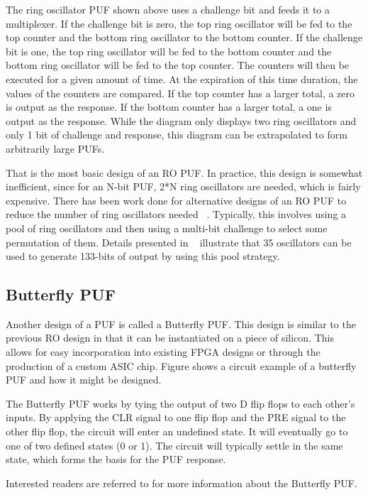 The ring oscillator PUF shown above uses a challenge bit and feeds it to a multiplexer.
If the challenge bit is zero, the top ring oscillator will be fed to the top counter and
the bottom ring oscillator to the bottom counter. If the challenge bit is one, the top
ring oscillator will be fed to the bottom counter and the bottom ring oscillator will
be fed to the top counter. The counters will then be executed for a given amount of time.
At the expiration of this time duration, the values of the counters are compared. If the
top counter has a larger total, a zero is output as the response. If the bottom counter
has a larger total, a one is output as the response. 
While the diagram only displays two ring oscillators and only 1 bit of challenge and
response, this diagram can be extrapolated to form arbitrarily large PUFs.

That is the most basic design of an RO PUF. In practice, this design is somewhat 
inefficient, since for an N-bit PUF, 2*N ring oscillators are needed, which is fairly
expensive. There has been work done for alternative designs of
an RO PUF to reduce the number of ring oscillators needed ~\cite{aegis_pool}. 
Typically, this involves using
a pool of ring oscillators and then using a multi-bit challenge to select some permutation
of them. Details presented in ~\cite{aegis_pool} illustrate that 35 oscillators can
be used to generate 133-bits of output by using this pool strategy.

\subsection{Butterfly PUF}
Another design of a PUF is called a Butterfly PUF. This design is similar to the previous
RO design in that it can be instantiated on a piece of silicon. This allows for easy
incorporation into existing FPGA designs or through the production of a custom ASIC chip.
Figure \cite{fig:butterfly} shows a circuit example of a butterfly PUF and how it might be
designed.

The Butterfly PUF works by tying the output of two D flip flops to each other's inputs. By applying
the CLR signal to one flip flop and the PRE signal to the other flip flop, the circuit will enter an
undefined state. It will eventually go to one of two defined states (0 or 1). The circuit will typically
settle in the same state, which forms the basis for the PUF response.

Interested readers are referred to \cite{butterflypuf} for more information about the Butterfly PUF.

